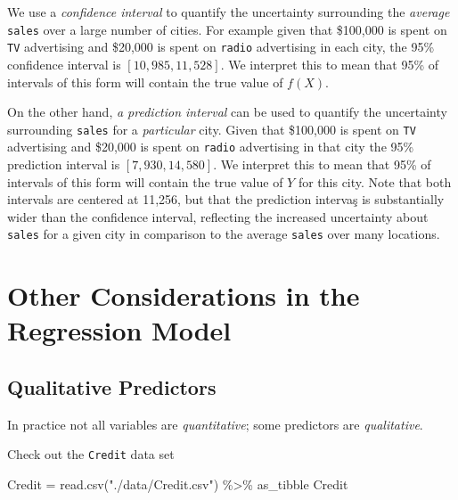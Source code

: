 \documentclass[
  letterpaper,
  DIV=11,
  numbers=noendperiod]{scrreprt}
\newenvironment{Shaded}{\begin{snugshade}}{\end{snugshade}}
\newcommand{\FunctionTok}[1]{\textcolor[rgb]{0.02,0.16,0.49}{#1}}
\newcommand{\NormalTok}[1]{\textcolor[rgb]{0.33,0.33,0.33}{#1}}
\newcommand{\OtherTok}[1]{\textcolor[rgb]{0.85,0.12,0.09}{#1}}
\newcommand{\SpecialCharTok}[1]{\textcolor[rgb]{0.00,0.46,0.62}{#1}}
\newcommand{\StringTok}[1]{\textcolor[rgb]{0.00,0.50,0.00}{#1}}
\begin{document}
We use a \emph{confidence interval} to quantify the uncertainty
surrounding the \emph{average} \texttt{sales} over a large number of
cities. For example given that \$100,000 is spent on \texttt{TV}
advertising and \$20,000 is spent on \texttt{radio} advertising in each
city, the 95\% confidence interval is \([10,985, 11,528]\). We interpret
this to mean that 95\% of intervals of this form will contain the true
value of \(f(X)\).

On the other hand, \emph{a prediction interval} can be used to quantify
the uncertainty surrounding \texttt{sales} for a \emph{particular} city.
Given that \$100,000 is spent on \texttt{TV} advertising and \$20,000 is
spent on \texttt{radio} advertising in that city the 95\% prediction
interval is \([7,930, 14,580]\). We interpret this to mean that 95\% of
intervals of this form will contain the true value of \(Y\) for this
city. Note that both intervals are centered at 11,256, but that the
prediction intervaş is substantially wider than the confidence interval,
reflecting the increased uncertainty about \texttt{sales} for a given
city in comparison to the average \texttt{sales} over many locations.

\hypertarget{other-considerations-in-the-regression-model}{%
\section{Other Considerations in the Regression
Model}\label{other-considerations-in-the-regression-model}}

\hypertarget{qualitative-predictors}{%
\subsection{Qualitative Predictors}\label{qualitative-predictors}}

In practice not all variables are \emph{quantitative}; some predictors
are \emph{qualitative}.

Check out the \texttt{Credit} data set

\begin{Shaded}
\begin{Highlighting}[]
\NormalTok{Credit }\OtherTok{=} \FunctionTok{read.csv}\NormalTok{(}\StringTok{"./data/Credit.csv"}\NormalTok{) }\SpecialCharTok{\%\textgreater{}\%}\NormalTok{ as\_tibble}
\NormalTok{Credit}
\end{Highlighting}
\end{Shaded}
\end{document}
